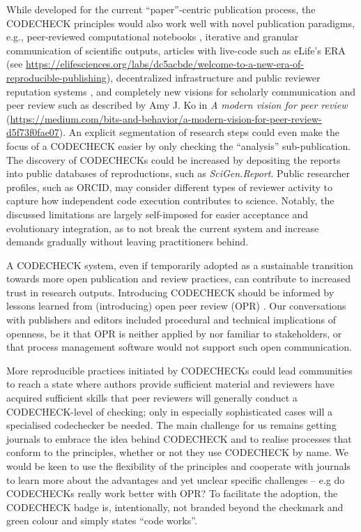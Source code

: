 \documentclass[12pt]{article}
\begin{document}
While developed for the current ``paper''-centric publication process,
the CODECHECK principles would also work well with novel publication
paradigms, e.g., peer-reviewed computational notebooks
\cite{earthcube_new_2020}, iterative and granular communication of
scientific outputs, articles with live-code
\cite{perkel_pioneering_2019-1} such as eLife's ERA
(see \url{https://elifesciences.org/labs/dc5acbde/welcome-to-a-new-era-of-reproducible-publishing}),
decentralized infrastructure and public reviewer reputation systems
\cite{tenorio-fornes_towards_2019}, and completely new visions for
scholarly communication and peer review such as described by Amy J. Ko
in \emph{A modern vision for peer review}
(\url{https://medium.com/bits-and-behavior/a-modern-vision-for-peer-review-d5f73f0fae07}).
An explicit segmentation of research steps could even make the focus
of a CODECHECK easier by only checking the ``analysis''
sub-publication.  The discovery of CODECHECKs could be increased by
depositing the reports into public databases of reproductions, such as
\emph{SciGen.Report}.  Public researcher profiles, such as ORCID, may
consider different types of reviewer activity to capture how
independent code execution contributes to science.  Notably, the
discussed limitations are largely self-imposed for easier acceptance
and evolutionary integration, as to not break the current system and
increase demands gradually without leaving practitioners behind.

A CODECHECK system, even if temporarily adopted as a sustainable
transition towards more open publication and review practices, can
contribute to increased trust in research outputs. Introducing
CODECHECK should be informed by lessons learned from (introducing)
open peer review (OPR) \cite{ross-hellauer_guidelines_2019}.  Our
conversations with publishers and editors included procedural and
technical implications of openness, be it that OPR is neither applied
by nor familiar to stakeholders, or that process management software
would not support such open communication.

More reproducible practices initiated by CODECHECKs could lead
communities to reach a state where authors provide sufficient material
and reviewers have acquired sufficient skills that peer reviewers will
generally conduct a CODECHECK-level of checking; only in especially
sophisticated cases will a specialised codechecker be needed.  The
main challenge for us remains getting journals to embrace the idea
behind CODECHECK and to realise processes that conform to the
principles, whether or not they use CODECHECK by name.  We would be
keen to use the flexibility of the principles and cooperate with
journals to learn more about the advantages and yet unclear specific
challenges -- e.g do CODECHECKs really work better with OPR?  To
facilitate the adoption, the CODECHECK badge is, intentionally, not
branded beyond the checkmark and green colour and simply states ``code
works''.
\end{document}
